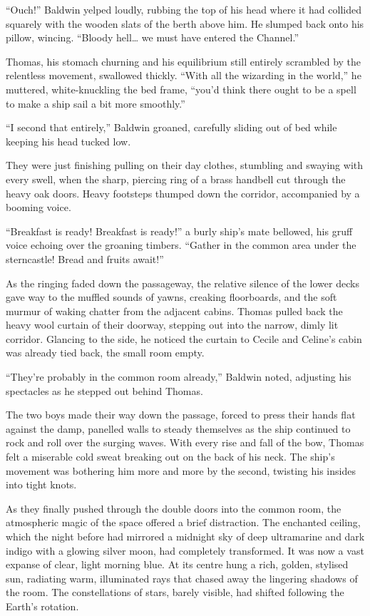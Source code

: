 \enquote{Ouch!} Baldwin yelped loudly, rubbing the top of his head where it had collided squarely with the wooden slats of the berth above him. He slumped back onto his pillow, wincing. \enquote{Bloody hell\ldots{} we must have entered the Channel.}

Thomas, his stomach churning and his equilibrium still entirely scrambled by the relentless movement, swallowed thickly. \enquote{With all the wizarding in the world,} he muttered, white-knuckling the bed frame, \enquote{you'd think there ought to be a spell to make a ship sail a bit more smoothly.}

\enquote{I second that entirely,} Baldwin groaned, carefully sliding out of bed while keeping his head tucked low.

They were just finishing pulling on their day clothes, stumbling and swaying with every swell, when the sharp, piercing ring of a brass handbell cut through the heavy oak doors. Heavy footsteps thumped down the corridor, accompanied by a booming voice.

\enquote{Breakfast is ready! Breakfast is ready!} a burly ship's mate bellowed, his gruff voice echoing over the groaning timbers. \enquote{Gather in the common area under the sterncastle! Bread and fruits await!}

As the ringing faded down the passageway, the relative silence of the lower decks gave way to the muffled sounds of yawns, creaking floorboards, and the soft murmur of waking chatter from the adjacent cabins. Thomas pulled back the heavy wool curtain of their doorway, stepping out into the narrow, dimly lit corridor. Glancing to the side, he noticed the curtain to Cecile and Celine's cabin was already tied back, the small room empty.

\enquote{They're probably in the common room already,} Baldwin noted, adjusting his spectacles as he stepped out behind Thomas.

The two boys made their way down the passage, forced to press their hands flat against the damp, panelled walls to steady themselves as the ship continued to rock and roll over the surging waves. With every rise and fall of the bow, Thomas felt a miserable cold sweat breaking out on the back of his neck. The ship's movement was bothering him more and more by the second, twisting his insides into tight knots.

As they finally pushed through the double doors into the common room, the atmospheric magic of the space offered a brief distraction. The enchanted ceiling, which the night before had mirrored a midnight sky of deep ultramarine and dark indigo with a glowing silver moon, had completely transformed. It was now a vast expanse of clear, light morning blue. At its centre hung a rich, golden, stylised sun, radiating warm, illuminated rays that chased away the lingering shadows of the room. The constellations of stars, barely visible, had shifted following the Earth's rotation.

